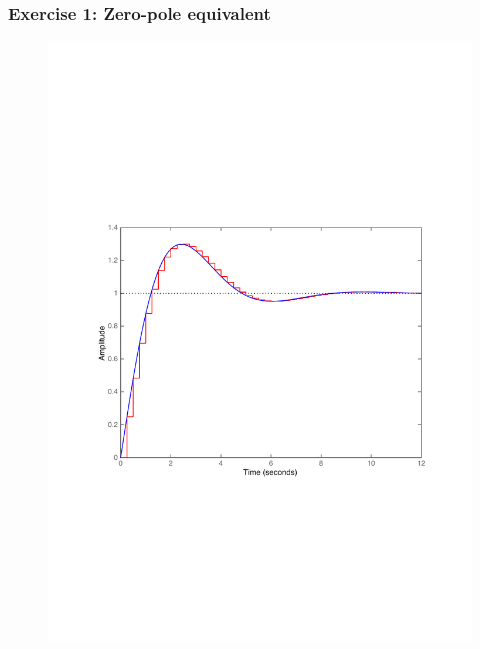 \begin{frame}
	\frametitle{Exercise 1: Zero-pole equivalent}
	\vspace{-0.7em}
	\begin{figure}
		\centering
		\includegraphics[width=0.8\linewidth]{vb4}
	\end{figure}
\end{frame}

